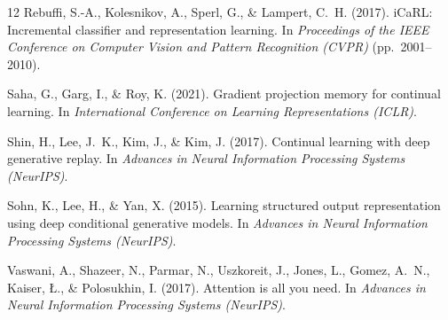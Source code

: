 \documentclass[11pt,a4paper]{article}
\begin{document}
{\begin{thebibliography}{12}
Rebuffi, S.-A., Kolesnikov, A., Sperl, G., \& Lampert, C.~H. (2017). iCaRL: Incremental classifier and representation learning. In \emph{Proceedings of the IEEE Conference on Computer Vision and Pattern Recognition (CVPR)} (pp.~2001--2010).

Saha, G., Garg, I., \& Roy, K. (2021). Gradient projection memory for continual learning. In \emph{International Conference on Learning Representations (ICLR)}.

Shin, H., Lee, J.~K., Kim, J., \& Kim, J. (2017). Continual learning with deep generative replay. In \emph{Advances in Neural Information Processing Systems (NeurIPS)}.

Sohn, K., Lee, H., \& Yan, X. (2015). Learning structured output representation using deep conditional generative models. In \emph{Advances in Neural Information Processing Systems (NeurIPS)}.

Vaswani, A., Shazeer, N., Parmar, N., Uszkoreit, J., Jones, L., Gomez, A.~N., Kaiser, \L., \& Polosukhin, I. (2017). Attention is all you need. In \emph{Advances in Neural Information Processing Systems (NeurIPS)}.
\end{thebibliography}
}
\end{document}
